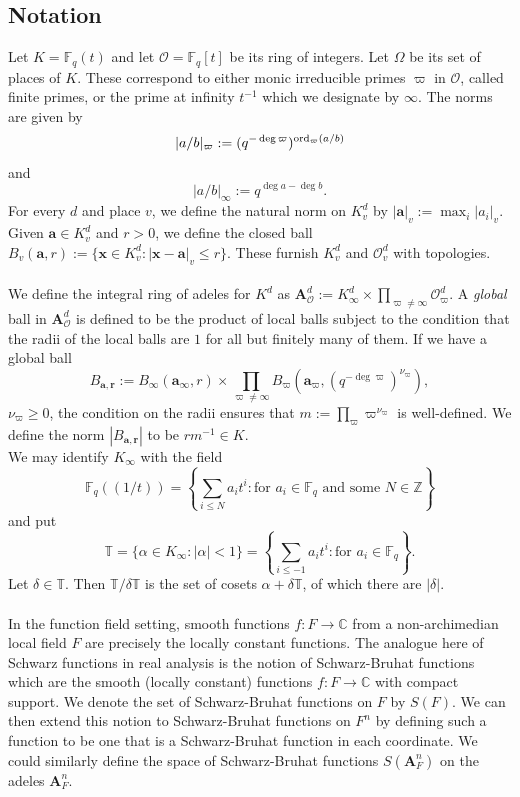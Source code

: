 \documentclass[11pt]{amsart}
\theoremstyle{plain}
\theoremstyle{plain}
\theoremstyle{remark}
\theoremstyle{definition}
\newcommand{\ord}{\textup{ord}}
\newcommand{\FF}{\mathbb{F}}
\newcommand{\ZZ}{\mathbb{Z}}
\newcommand{\TT}{\mathbb{T}}
\begin{document}
\subsection{Notation}
Let $K=\mathbb{F}_q(t)$ and let $\mathcal{O}=\mathbb{F}_q[t]$ be its ring of integers. Let $\Omega$ be its set of places of $K$. These correspond to either monic irreducible primes $\varpi$ in $\mathcal{O}$, called finite primes, or the prime at infinity $t^{-1}$ which we designate by $\infty$. The norms are given by
\[|a/b|_{\varpi}:=(q^{-\deg\varpi})^{\ord_{\varpi}(a/b)}\]
and
\[|a/b|_{\infty}:=q^{\deg a-\deg b}.\]
For every $d$ and place $v$, we define the natural norm on $K_v^d$ by $|\mathbf{a}|_v:=\max_i|a_i|_v$. Given $\mathbf{a}\in K_v^d$ and $r>0$, we define the closed ball $B_v(\mathbf{a},r):=\{\mathbf{x}\in K_v^d:|\mathbf{x}-\mathbf{a}|_v\leq r\}$. These furnish $K_v^d$ and $\mathcal{O}_v^d$ with topologies.\\
\\
We define the integral ring of adeles for $K^d$ as $\mathbf{A}^d_{\mathcal{O}}:=K_{\infty}^d\times\prod_{\varpi\neq\infty}\mathcal{O}_{\varpi}^d$. A \textit{global} ball in $\mathbf{A}^d_{\mathcal{O}}$ is defined to be the product of local balls subject to the condition that the radii of the local balls are $1$ for all but finitely many of them. If we have a global ball
\[B_{\mathbf{a},\mathbf{r}}:=B_{\infty}(\mathbf{a}_{\infty},r)\times\prod_{\varpi\neq\infty}B_{\varpi}(\mathbf{a}_{\varpi},(q^{-\deg\varpi})^{\nu_{\varpi}}),\]
$\nu_{\varpi}\geq 0$, the condition on the radii ensures that $m:=\prod_{\varpi}\varpi^{\nu_{\varpi}}$ is well-defined. We define the norm $|B_{\mathbf{a},\mathbf{r}}|$ to be $rm^{-1}\in K$.\\
We may identify $K_\infty$ with the field
$$
\FF_q(\!(1/t)\!)=\left\{\sum_{i\leq N}a_it^i: \mbox{for $a_i\in \FF_q$ and some $N\in\ZZ$} \right\}
$$
and put 
$$
\TT=\{\alpha\in K_\infty: |\alpha|<1\}=\left\{\sum_{i\leq -1}a_it^i: \mbox{for $a_i\in \FF_q$}
\right\}.
$$
Let  $\delta\in \TT$. Then $\TT/\delta\TT$ is the set of cosets $\alpha+\delta \TT$, of which there are  
$|\delta|.$\\
\\
In the function field setting, smooth functions $f:F\rightarrow\mathbb{C}$ from a non-archimedian local field $F$ are precisely the locally constant functions. The analogue here of Schwarz functions in real analysis is the notion of Schwarz-Bruhat functions which are the smooth (locally constant) functions $f:F\rightarrow\mathbb{C}$ with compact support. We denote the set of Schwarz-Bruhat functions on $F$ by $S(F)$. We can then extend this notion to Schwarz-Bruhat functions on $F^n$ by defining such a function to be one that is a Schwarz-Bruhat function in each coordinate. We could similarly define the space of Schwarz-Bruhat functions $S(\mathbf{A}^n_F)$ on the adeles $\mathbf{A}^n_F$.
\end{document}

